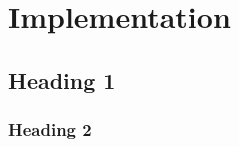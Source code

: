 \chapter[Implementation]{Implementation}
\label{Chap:Implementation}



\section{Heading 1}

\subsection{Heading 2}
\lipsum[4]

